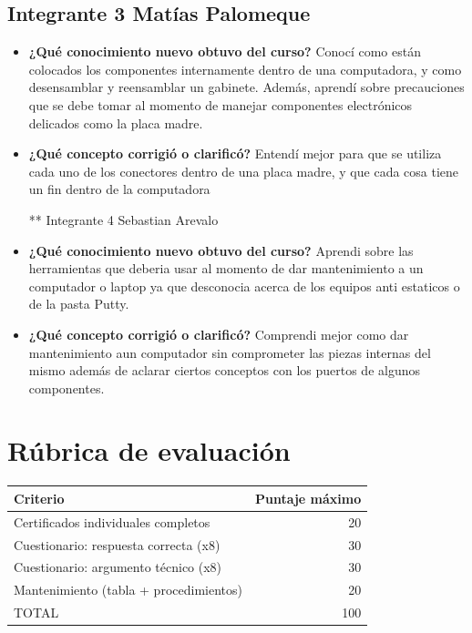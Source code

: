 \documentclass{article}
\begin{document}
\subsection{Integrante 3 Matías Palomeque}
\label{sec:org707a60a}
\begin{itemize}
\item \textbf{¿Qué conocimiento nuevo obtuvo del curso?} Conocí como están
colocados los componentes internamente dentro de una computadora,
y como desensamblar y reensamblar un gabinete. Además, aprendí
sobre precauciones que se debe tomar al momento de manejar
componentes electrónicos delicados como la placa madre.
\item \textbf{¿Qué concepto corrigió o clarificó?} Entendí mejor para que se
utiliza cada uno de los conectores dentro de una placa madre, y
que cada cosa tiene un fin dentro de la computadora

** Integrante 4 Sebastian Arevalo
\item \textbf{¿Qué conocimiento nuevo obtuvo del curso?} Aprendi sobre las
herramientas que deberia usar al momento de dar mantenimiento a
un computador o laptop ya que desconocia acerca de los equipos
anti estaticos o de la pasta Putty.
\item \textbf{¿Qué concepto corrigió o clarificó?} Comprendi mejor como dar
mantenimiento aun computador sin comprometer las piezas internas
del mismo además de aclarar ciertos conceptos con los puertos de
algunos componentes.
\end{itemize}
\section{Rúbrica de evaluación}
\label{sec:org63889ef}

\begin{center}
\begin{tabular}{lr}
Criterio & Puntaje máximo\\[0pt]
\hline
Certificados individuales completos & 20\\[0pt]
Cuestionario: respuesta correcta (x8) & 30\\[0pt]
Cuestionario: argumento técnico (x8) & 30\\[0pt]
Mantenimiento (tabla + procedimientos) & 20\\[0pt]
TOTAL & 100\\[0pt]
\end{tabular}
\end{center}
\end{document}
